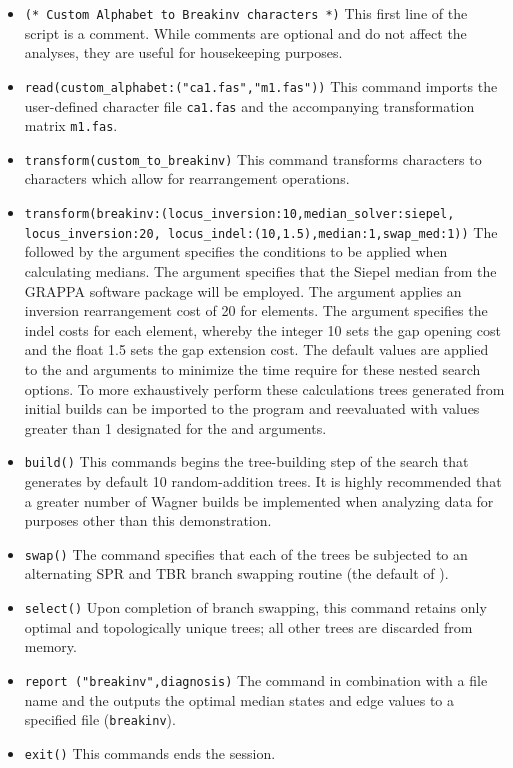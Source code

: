 \begin{itemize}
\item \texttt{(* Custom Alphabet to Breakinv characters  *)} This first line of the script is a comment. While comments are optional and do not affect the analyses, they are useful for housekeeping purposes.
\item \texttt{read(custom\_alphabet:("ca1.fas","m1.fas"))} This command imports the user-defined  character file \texttt{ca1.fas} and the accompanying transformation matrix \texttt{m1.fas}.
\item \texttt{transform(custom\_to\_breakinv)} This command transforms  characters to  characters which allow for rearrangement operations.
\item \texttt{transform(breakinv:(locus\_inversion:10,median\_solver:siepel, locus\_inversion:20, locus\_indel:(10,1.5),median:1,swap\_med:1))}  The  followed by the argument  specifies the conditions to be applied when calculating medians. The argument \poyargument{[median\_solver:siepel} specifies that the Siepel median from the GRAPPA software package \cite{baderetal2002} will be employed.  The argument  applies an inversion rearrangement cost of 20 for  elements. The argument  specifies the indel costs for each  element, whereby the integer 10 sets the gap opening cost and the float 1.5 sets the gap extension cost.  The default values are applied to the  and  arguments to minimize the time require for these nested search options.   To more exhaustively perform these calculations trees generated from initial builds can be imported to the program and reevaluated with values greater than 1 designated for the  and  arguments.
\item \texttt{build()} This commands begins the tree-building step of the search that generates by default 10 random-addition trees.  It is highly recommended that a greater number of Wagner builds be implemented when analyzing data for purposes other than this demonstration.
\item \texttt{swap()} The  command specifies that each of the trees be subjected to an alternating SPR and TBR branch swapping routine (the default of \poy).
\item \texttt{select()} Upon completion of branch swapping, this command retains only optimal and topologically unique trees; all other trees are discarded from memory. 
\item \texttt{report ("breakinv",diagnosis)}  The  command in combination with a file name and the  outputs the optimal median states and edge values to a specified file (\texttt{breakinv}). 
\item \texttt{exit()} This commands ends the \poy session.
\end{itemize}

